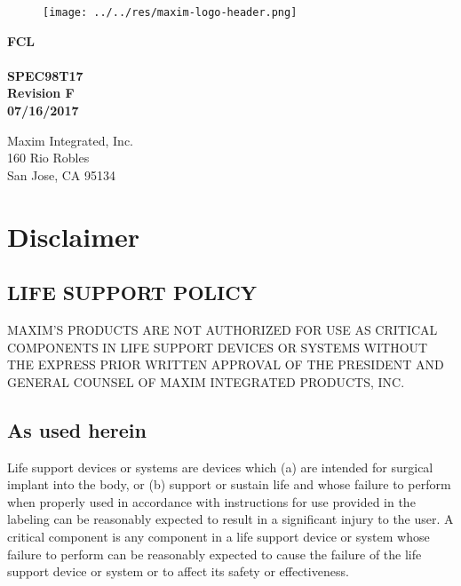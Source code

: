 \documentclass[twoside]{book}
\newcommand\docrev{Revision F }
\newcommand\docref{SPEC98T17 }
\newcommand\docdate{07/16/2017 }
\newcommand{\+}{\discretionary{\mbox{\scriptsize$\hookleftarrow$}}{}{}}
\begin{document}
\hypersetup{pageanchor=false,
             bookmarksnumbered=true,
             pdfencoding=unicode
            }
\begin{titlepage}
\vspace*{7cm}
\begin{flushleft}
\begin{figure}[H]
\texttt{[image: ../../res/maxim-logo-header.png]}
\end{figure}
\textbf{\Large{\bf{F\+CL}\\}}
\textbf{\\\docref\\}
\textbf{\docrev\\}
\textbf{\docdate\\}
\end{flushleft}

\vspace*{7cm}
\begin{flushright}
Maxim Integrated, Inc.\\
160 Rio Robles\\
San Jose, CA 95134\\
\end{flushright}

\end{titlepage}

\section*{Disclaimer}

\subsection*{LIFE SUPPORT POLICY}
MAXIM’S PRODUCTS ARE NOT AUTHORIZED FOR USE AS CRITICAL COMPONENTS IN LIFE SUPPORT DEVICES OR SYSTEMS WITHOUT THE EXPRESS PRIOR WRITTEN APPROVAL OF THE PRESIDENT AND GENERAL COUNSEL OF MAXIM INTEGRATED PRODUCTS, INC. 

\subsection*{As used herein}
Life support devices or systems are devices which (a) are intended for surgical implant into the body, or (b) support or sustain life and whose failure to perform when properly used in accordance with instructions for use provided in the labeling can be reasonably expected to result in a significant injury to the user. A critical component is any component in a life support device or system whose failure to perform can be reasonably expected to cause the failure of the life support device or system or to affect its safety or effectiveness.
\end{document}
